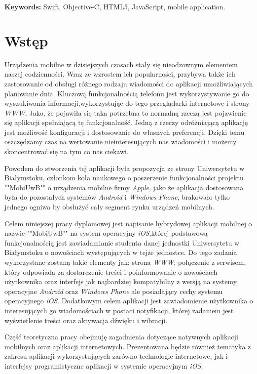 \documentclass{iiuwb}
\begin{document}
\textbf{Keywords:} Swift, Objective-C, HTML5, JavaScript, mobile application.
\cleardoublepage
\chapter*{Wstęp}                        %
\label{cha:Wstep}                       %
Urządzenia mobilne w dzisiejszych czasach stały się nieodzownym elementem naszej codzienności. Wraz ze wzrostem ich popularności, przybywa także ich zastosowanie od obsługi różnego rodzaju wiadomości do aplikacji umożliwiających planowanie dnia. Kluczową funkcjonalnością telefonu jest wykorzystywanie go do wyszukiwania informacji,wykorzystując do tego przeglądarki internetowe i strony \textit{WWW}. Jako, że pojawiła się taka potrzebna to normalną rzeczą jest pojawienie się aplikacji spełniającą tę funkcjonalność. Jedną z rzeczy odróżniającą aplikację jest możliwość konfiguracji i dostosowanie do własnych preferencji. Dzięki temu oszczędzamy czas na wertowanie nieinteresujących nas wiadomości i możemy skoncentrować się na tym co nas ciekawi. 

Powodem do stworzenia tej aplikacji była propozycja ze strony Uniwersytetu w Białymstoku, członkom koła naukowego o poszerzenie funkcjonalności projektu ""MobiUwB"" o urządzenia mobilne firmy \textit{Apple}, jako że aplikacja dostosowana była do pozostałych systemów \textit{Android} i \textit{Windows Phone}, brakowało tylko jednego ogniwa by obsłużyć cały segment rynku urządzeń mobilnych.

Celem niniejszej pracy dyplomowej jest napisanie hybrydowej aplikacji mobilnej o nazwie ""MobiUwB"" na system operacyjny \textit{iOS},której podstawową funkcjonalnością  jest zawiadamianie studenta danej jednostki Uniwersytetu w Białymstoku o nowościach występujących w tejże jednostce. Do tego zadania wykorzystane zostaną takie elementy jak: strona \textit{WWW}; połączenie z serwisem, który odpowiada za dostarczenie treści i poinformowanie o nowościach użytkownika oraz interfejs jak najbardziej kompatybilny z wersją na systemy operacyjne \textit{Android} oraz \textit{Windows Phone} ale posiadający cechy systemu operacyjnego \textit{iOS}. Dodatkowym celem aplikacji jest zawiadomienie użytkownika o interesujących go wiadomościach w postaci notyfikacji, której zadaniem jest wyświetlenie treści oraz aktywacja dźwięku i wibracji.

Część teoretyczna pracy obejmuję zagadnienia dotyczące natywnych aplikacji mobilnych oraz aplikacji internetowych. Prezentowana będzie również tematyka z zakresu aplikacji wykorzystujących zarówno technologie internetowe, jak i interfejsy programistyczne aplikacji w systemie operacyjnym \textit{iOS}.
\end{document}
